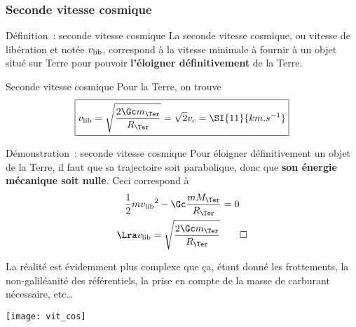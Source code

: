 \documentclass[../main/main.tex]{subfiles}
\begin{document}
\subsubsection{Seconde vitesse cosmique}
\begin{tdefi}{Définition~: seconde vitesse cosmique}
    La seconde vitesse cosmique, ou vitesse de libération et notée $v_{\rm lib}$,
    correspond à la vitesse minimale à fournir à un objet situé sur Terre pour
    pouvoir \textbf{l’éloigner définitivement} de la Terre.
\end{tdefi}
\begin{tprop}{Seconde vitesse cosmique}
    Pour la Terre, on trouve
    \[
        \boxed{v_{\rm lib} = \sqrt{\frac{2\Gc m_\Ter}{R_\Ter}} = \sqrt{2}v_c =
        \SI{11}{km.s^{-1}}}
    \]
\end{tprop}
\begin{tdemo}{Démonstration~: seconde vitesse cosmique}
    Pour éloigner définitivement un objet de la Terre, il faut que sa
    trajectoire soit parabolique, donc que \textbf{son énergie mécanique soit
    nulle}. Ceci correspond à
    \begin{gather*}
        \frac{1}{2}mv_{\rm lib}{}^2 -\Gc \frac{mM_\Ter}{R_\Ter} = 0
        \\\Lra
        v_{\rm lib} = \sqrt{\frac{2\Gc m_\Ter}{R_\Ter}}
        \qed
    \end{gather*}
\end{tdemo}
La réalité est évidemment plus complexe que ça, étant donné les frottements, la
non-galiléanité des référentiels, la prise en compte de la masse de carburant
nécessaire, etc…
\begin{center}
    \texttt{[image: vit\_cos]}
\end{center}
\end{document}
